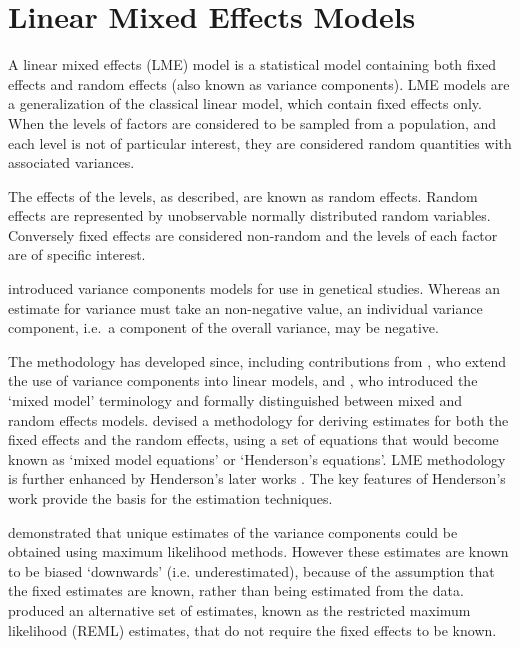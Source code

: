 \documentclass[12pt, a4paper]{report}
\theoremstyle{definition}
\theoremstyle{remark}
\begin{document}
\section{Linear Mixed Effects Models}
A linear mixed effects (LME) model is a statistical model containing both fixed effects and random effects (also known as variance components). LME models are a generalization of the classical linear model, which contain fixed effects only. When the levels of factors are considered to be sampled from a population, and each level is not of particular interest, they are considered random quantities with associated variances.

The effects of the levels, as described, are known as random effects. Random effects are represented by unobservable normally distributed random variables. Conversely fixed effects are considered non-random and the levels of each factor are of specific interest.

\citet{Fisher4} introduced variance components models for use in genetical studies. Whereas an estimate for variance must take an non-negative value, an individual variance component, i.e.\ a component of the overall variance, may be negative.

The methodology has developed since, including contributions from
\citet{tippett}, who extend the use of variance components into linear models, and \citet{eisenhart}, who introduced the `mixed model' terminology and formally distinguished between mixed and random effects models. \citet{Henderson1950} devised a methodology for deriving estimates for both the fixed effects and the random effects, using a set of equations that would become known as `mixed model equations' or `Henderson's equations'.
LME methodology is further enhanced by Henderson's later works \citep{Henderson53, Henderson59,Henderson63,Henderson73,Henderson84a}. The key features of Henderson's work provide the basis for the estimation techniques.

\citet{HartleyRao} demonstrated that unique estimates of the variance components could be obtained using maximum likelihood methods. However these estimates are known to be biased `downwards' (i.e. underestimated), because of the assumption that the fixed estimates are known, rather than being estimated from the data. \citet{PT71} produced an alternative set of estimates, known as the restricted maximum likelihood (REML) estimates, that do not require the fixed effects to be known. 
\end{document}
